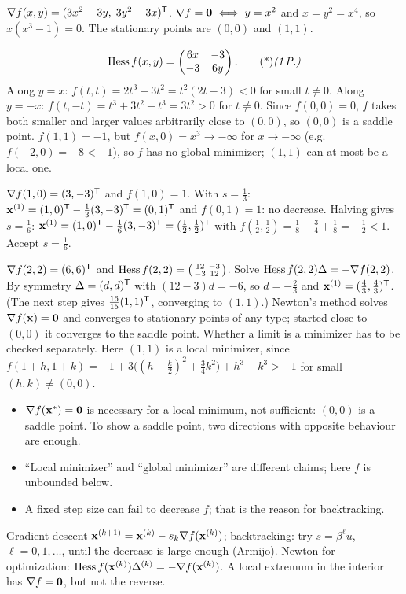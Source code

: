 \begin{solution}
 $\nabla f(x,y)=(3x^2-3y,\;3y^2-3x)^{\mathsf{T}}$. 
$\nabla f=\mathbf{0}\iff y=x^2$ and $x=y^2=x^4$, so $x(x^3-1)=0$. The stationary points are $(0,0)$ and $(1,1)$. 

\[
\Hess f(x,y)=\begin{pmatrix}6x&-3\\-3&6y\end{pmatrix}.\ptd{1}
\]
Along $y=x$: $f(t,t)=2t^3-3t^2=t^2(2t-3)<0$ for small $t\neq0$. Along $y=-x$: $f(t,-t)=t^3+3t^2-t^3=3t^2>0$ for $t\neq0$. Since $f(0,0)=0$, $f$ takes both smaller and larger values arbitrarily close to $(0,0)$, so $(0,0)$ is a saddle point. 
$f(1,1)=-1$, but $f(x,0)=x^3\to-\infty$ for $x\to-\infty$ (e.g.\ $f(-2,0)=-8<-1$), so $f$ has no global minimizer; $(1,1)$ can at most be a local one. 

 $\nabla f(1,0)=(3,-3)^{\mathsf{T}}$ and $f(1,0)=1$. With $s=\frac13$:
$\mathbf{x}^{(1)}=(1,0)^{\mathsf{T}}-\frac13(3,-3)^{\mathsf{T}}=(0,1)^{\mathsf{T}}$ and $f(0,1)=1$: no decrease. 
Halving gives $s=\frac16$: $\mathbf{x}^{(1)}=(1,0)^{\mathsf{T}}-\frac16(3,-3)^{\mathsf{T}}=(\frac12,\frac12)^{\mathsf{T}}$ with $f(\frac12,\frac12)=\frac18-\frac34+\frac18=-\frac12<1$. Accept $s=\frac16$. 

 $\nabla f(2,2)=(6,6)^{\mathsf{T}}$ and $\operatorname{Hess} f(2,2)=\begin{psmallmatrix}12&-3\\-3&12\end{psmallmatrix}$. 
Solve $\operatorname{Hess} f(2,2)\Delta=-\nabla f(2,2)$. By symmetry $\Delta=(d,d)^{\mathsf{T}}$ with $(12-3)d=-6$, so $d=-\frac23$ and $\mathbf{x}^{(1)}=(\frac43,\frac43)^{\mathsf{T}}$. (The next step gives $\frac{16}{15}(1,1)^{\mathsf{T}}$, converging to $(1,1)$.) 
Newton's method solves $\nabla f(\mathbf{x})=\mathbf{0}$ and converges to stationary points of any type; started close to $(0,0)$ it converges to the saddle point. Whether a limit is a minimizer has to be checked separately. Here $(1,1)$ is a local minimizer, since $f(1+h,1+k)=-1+3\big((h-\frac k2)^2+\frac34k^2\big)+h^3+k^3>-1$ for small $(h,k)\neq(0,0)$. 

\begin{trap}
\begin{itemize}
\item $\nabla f(\mathbf{x}^*)=\mathbf{0}$ is necessary for a local minimum, not sufficient: $(0,0)$ is a saddle point. To show a saddle point, two directions with opposite behaviour are enough.
\item ``Local minimizer'' and ``global minimizer'' are different claims; here $f$ is unbounded below.
\item A fixed step size can fail to decrease $f$; that is the reason for backtracking.
\end{itemize}
\end{trap}
\begin{heart}
Gradient descent $\mathbf{x}^{(k+1)}=\mathbf{x}^{(k)}-s_k\nabla f(\mathbf{x}^{(k)})$; backtracking: try $s=\beta^\ell u$, $\ell=0,1,\dots$, until the decrease is large enough (Armijo). Newton for optimization: $\operatorname{Hess} f(\mathbf{x}^{(k)})\Delta^{(k)}=-\nabla f(\mathbf{x}^{(k)})$. A local extremum in the interior has $\nabla f=\mathbf{0}$, but not the reverse.
\end{heart}
\end{solution}

